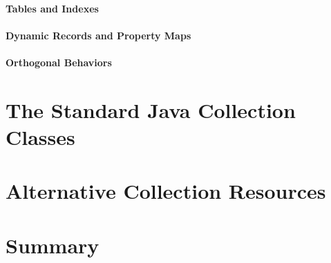 \paragraph{Tables and Indexes}
\paragraph{Dynamic Records and Property Maps}
\paragraph{Orthogonal Behaviors}

\section{The Standard Java Collection Classes}

\section{Alternative Collection Resources}

\section{Summary}

